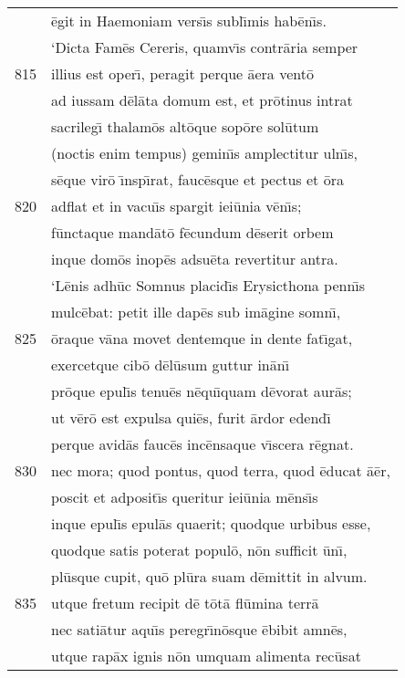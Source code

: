 \documentclass[paper=6in:9in,pagesize=pdftex,
               headinclude=on,footinclude=on,12pt]{scrbook}
\begin{document}
\begin{longtable}[p]{ r l }
 & \=egit in Haemoniam vers\={\i}s subl\={\i}mis hab\=en\={\i}s.\\ 
 & \indent `Dicta Fam\=es Cereris, quamv\={\i}s contr\=aria semper\\ 
815 & illius est oper\={\i}, peragit perque \=aera vent\=o\\ 
 & ad iussam d\=el\=ata domum est, et pr\=otinus intrat\\ 
 & sacrileg\={\i} thalam\=os alt\=oque sop\=ore sol\=utum\\ 
 & (noctis enim tempus) gemin\={\i}s amplectitur uln\={\i}s,\\ 
 & s\=eque vir\=o \={\i}nsp\={\i}rat, fauc\=esque et pectus et \=ora\\ 
820 & adflat et in vacu\={\i}s spargit iei\=unia v\=en\={\i}s;\\ 
 & f\=unctaque mand\=at\=o f\=ecundum d\=eserit orbem\\ 
 & inque dom\=os inop\=es adsu\=eta revertitur antra.\\ 
 & \indent `L\=enis adh\=uc Somnus placid\={\i}s Erysicthona penn\={\i}s\\ 
 & mulc\=ebat: petit ille dap\=es sub im\=agine somn\={\i},\\ 
825 & \=oraque v\=ana movet dentemque in dente fat\={\i}gat,\\ 
 & exercetque cib\=o d\=el\=usum guttur in\=an\={\i}\\ 
 & pr\=oque epul\={\i}s tenu\=es n\=equ\={\i}quam d\=evorat aur\=as;\\ 
 & ut v\=er\=o est expulsa qui\=es, furit \=ardor edend\={\i}\\ 
 & perque avid\=as fauc\=es inc\=ensaque v\={\i}scera r\=egnat.\\ 
830 & nec mora; quod pontus, quod terra, quod \=educat \=a\=er,\\ 
 & poscit et adposit\={\i}s queritur iei\=unia m\=ens\={\i}s\\ 
 & inque epul\={\i}s epul\=as quaerit; quodque urbibus esse,\\ 
 & quodque satis poterat popul\=o, n\=on sufficit \=un\={\i},\\ 
 & pl\=usque cupit, qu\=o pl\=ura suam d\=emittit in alvum.\\ 
835 & utque fretum recipit d\=e t\=ot\=a fl\=umina terr\=a\\ 
 & nec sati\=atur aqu\={\i}s peregr\={\i}n\=osque \=ebibit amn\=es,\\ 
 & utque rap\=ax ignis n\=on umquam alimenta rec\=usat\\ 

\end{longtable}
\end{document}
